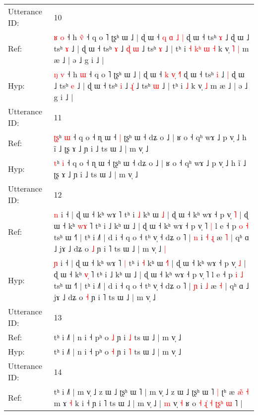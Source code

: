 \documentclass[10pt]{article}
\DeclareRobustCommand{\hl}[1]{{\textcolor{red}{#1}}}
\begin{document}
\begin{longtable}{ll}
 \\
\midrule
Utterance ID: & 10 \\
Ref: & \hl{ʁ} \hl{o} ˧ h \hl{v}\hl{̃} ˧ q o ˥ ʈʂʰ ɯ ˩ | ɖ ɯ ˧ \hl{q} \hl{ɑ}\hl{ }\hl{˩}\hl{ }\hl{|} ɖ ɯ ˧ tsʰ \hl{ɤ} ˩\hl{}\hl{} ɖ ɯ ˩ tsʰ \hl{ɤ} ˩ | ɖ ɯ ˧ tsʰ \hl{ɤ} ˩ \hl{ɖ}\hl{ }\hl{ɯ} ˩ tsʰ \hl{ɤ} ˩ | tʰ i\hl{ }\hl{˧}\hl{ }\hl{k}\hl{ʰ}\hl{ }\hl{ɯ} \hl{˧} k v̩\hl{ }\hl{˥} \hl{|} m æ ˩ | ə ˩ g i ˩ |
 \\
Hyp: & \hl{ŋ} \hl{v} ˧ h \hl{}\hl{ɯ} ˧ q o ˥ ʈʂʰ ɯ ˩ | ɖ ɯ ˧ \hl{k} \hl{v}\hl{̩}\hl{ }\hl{˧}\hl{˥} ɖ ɯ ˧ tsʰ \hl{i} ˩\hl{ }\hl{|} ɖ ɯ ˩ tsʰ \hl{e} ˩ | ɖ ɯ ˧ tsʰ \hl{i} ˩ \hl{}\hl{ɻ}\hl{̍} ˩ tsʰ \hl{ɯ} ˩ | tʰ i\hl{}\hl{}\hl{}\hl{}\hl{}\hl{}\hl{} \hl{˩} k v̩\hl{}\hl{} \hl{˩} m æ ˩ | ə ˩ g i ˩ |
 \\
\midrule
Utterance ID: & 11 \\
Ref: & \hl{ʈ}\hl{ʂ}ʰ \hl{ɯ} ˧ q o ˧ ɳ ɯ ˧\hl{ }\hl{|} ʈʂʰ ɯ ˧ dʑ o ˩ | ʁ o ˧ qʰ wɤ ˩ p v̩ ˩ h ĩ ˩ ʈʂ ɤ ˩ ɲ i ˩ ts ɯ ˩ | m v̩ ˩
 \\
Hyp: & \hl{}\hl{t}ʰ \hl{i} ˧ q o ˧ ɳ ɯ ˧\hl{}\hl{} ʈʂʰ ɯ ˧ dʑ o ˩ | ʁ o ˧ qʰ wɤ ˩ p v̩ ˩ h ĩ ˩ ʈʂ ɤ ˩ ɲ i ˩ ts ɯ ˩ | m v̩ ˩
 \\
\midrule
Utterance ID: & 12 \\
Ref: & \hl{n} i ˧ | ɖ ɯ ˧ kʰ wɤ ˥\hl{}\hl{} tʰ i \hl{˩} kʰ ɯ \hl{}\hl{˩} | ɖ ɯ ˧ kʰ wɤ ˧ p v̩ \hl{˥} | ɖ ɯ ˧ kʰ \hl{w}\hl{ɤ} ˥ tʰ i ˩ kʰ ɯ ˩ | ɖ ɯ ˧ kʰ wɤ ˧ p v̩ ˥\hl{ }\hl{|} l e ˧ p \hl{o} \hl{˧} tsʰ ɯ ˧˥ | tʰ i ˩˥ | d i ˧ q o ˧ tʰ v̩ ˧ dʑ o ˥ | \hl{n} i\hl{ }\hl{˧} \hl{ɻ} æ \hl{˥} | qʰ ɑ ˩ jɤ ˩ dʑ o \hl{˩} ɲ i ˥ ts ɯ ˩ | m v̩ ˩\hl{ }\hl{|}
 \\
Hyp: & \hl{ɲ} i ˧ | ɖ ɯ ˧ kʰ wɤ ˥\hl{ }\hl{|} tʰ i \hl{˧} kʰ ɯ \hl{˧}\hl{˥} | ɖ ɯ ˧ kʰ wɤ ˧ p v̩ \hl{˩} | ɖ ɯ ˧ kʰ \hl{v}\hl{̩} ˥ tʰ i ˩ kʰ ɯ ˩ | ɖ ɯ ˧ kʰ wɤ ˧ p v̩ ˥\hl{}\hl{} l e ˧ p \hl{i} \hl{˩} tsʰ ɯ ˧˥ | tʰ i ˩˥ | d i ˧ q o ˧ tʰ v̩ ˧ dʑ o ˥ | \hl{ɲ} i\hl{}\hl{} \hl{˩} æ \hl{˧} | qʰ ɑ ˩ jɤ ˩ dʑ o \hl{˧} ɲ i ˥ ts ɯ ˩ | m v̩ ˩\hl{}\hl{}
 \\
\midrule
Utterance ID: & 13 \\
Ref: & tʰ i ˩˥ | n i ˧ pʰ o \hl{˩} ɲ i \hl{˩} ts ɯ ˩ | m v̩ ˩
 \\
Hyp: & tʰ i ˩˥ | n i ˧ pʰ o \hl{˧} ɲ i \hl{˥} ts ɯ ˩ | m v̩ ˩
 \\
\midrule
Utterance ID: & 14 \\
Ref: & tʰ i ˩˥ | m v̩ ˩ z ɯ\hl{}\hl{}\hl{} ˩ ʈʂʰ ɯ ˥ | m v̩ ˩ z ɯ ˩ ʈʂʰ ɯ ˥\hl{ }\hl{|} ʈʰ æ \hl{æ}\hl{̃} \hl{˧} m ɤ \hl{˧} k i ˧ ɲ i ˥ ts ɯ ˩ | m v̩ ˩ |\hl{ }\hl{m} v̩ \hl{˧} ʁ o \hl{˧} \hl{ɻ}\hl{̍}\hl{ }\hl{˧} \hl{ʈ}\hl{ʂ}\hl{ʰ} \hl{ɯ}\hl{ }˥ |

\end{longtable}
\end{document}
